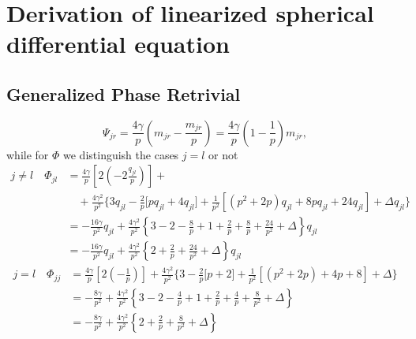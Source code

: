 \chapter[Derivation of linearized spherical ODE]{Derivation of linearized spherical differential equation}
\label{app:derivation-spherical-ode}

\section{Generalized Phase Retrivial}
\begin{equation}
  \Psi_{jr} = \frac{4 \gamma}{p}
      \left(m_{jr} - \frac{m_{jr}}{p}\right) 
      = \frac{4 \gamma}{p} \left(1 - \frac{1}{p}\right) m_{jr},
\end{equation}
while for \(\Phi\) we distinguish the cases \(j=l\) or not
\begin{equation}\begin{split}
  j \neq l \quad \Phi_{jl} &= \frac{4 \gamma}{p}\left[
      2\left( - 2\frac{q_{jl}}{p}\right)
  \right] +\\
  &\quad+\frac{4 \gamma^2}{p^2} \Biggr\{
        3 q_{jl} -\frac2{p}\Biggl[p q_{jl} + 4 q_{jl} \Biggl] + 
        \frac1{p^2}\left[\left(p^2+2p\right)q_{jl} +
        8p q_{jl} + 24q_{jl} \right] + \Delta q_{jl}\Biggr\} \\ 
  &= -\frac{16 \gamma}{p^2} q_{jl} 
    +\frac{4 \gamma^2}{p^2} \left\{
      3 -2 -\frac{8}{p} +1 +\frac2p +\frac8p + \frac{24}{p^2} + \Delta \right\}q_{jl} \\
  &= -\frac{16 \gamma}{p^2} q_{jl} 
  +\frac{4 \gamma^2}{p^2} \left\{2 +\frac{2}{p} + \frac{24}{p^2} + \Delta \right\}q_{jl}
\end{split}\end{equation}
\begin{equation}\begin{split}
  j = l \quad \Phi_{jj} &= \frac{4 \gamma}{p}\left[
      2\left( -\frac{1}{p}\right)
  \right] + \frac{4 \gamma^2}{p^2} \Biggr\{
        3 -\frac2{p}\Biggl[p + 2 \Biggl] + 
        \frac1{p^2}\left[\left(p^2+2p\right) +
        4p + 8 \right] + \Delta\Biggr\} \\
  &= -\frac{8 \gamma}{p^2} + \frac{4 \gamma^2}{p^2} \left\{
    3 -2 -\frac{4}{p} +1 +\frac2p +\frac4p + \frac{8}{p^2} + \Delta \right\} \\
  &= -\frac{8 \gamma}{p^2} +\frac{4 \gamma^2}{p^2} \left\{2 +\frac{2}{p} + \frac{8}{p^2} + \Delta \right\}
\end{split}\end{equation}

